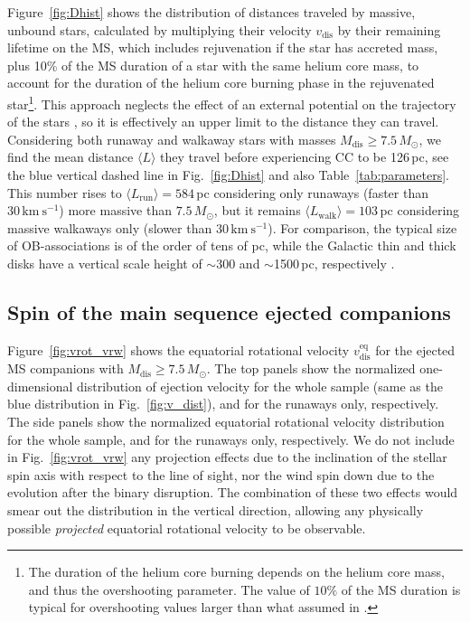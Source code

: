\documentclass{aa}
\DeclareRobustCommand{\Figref}[1]{Fig.~\ref{#1}}
\DeclareRobustCommand{\Tabref}[1]{Table~\ref{#1}}
\begin{document}
Figure~\ref{fig:Dhist} shows the distribution of distances traveled by
massive, unbound stars, calculated by multiplying their velocity
$v_\mathrm{dis}$ by their remaining lifetime on the MS, which includes
rejuvenation if the star has accreted mass, plus 10\% of the
MS duration of a star with the same helium core mass, to account for
the duration of the helium core burning phase in the rejuvenated
star\footnote{The duration of the helium core burning depends on the helium core mass, and thus the overshooting
parameter. The value of $10\%$ of the MS duration is typical for overshooting values
larger than what assumed in \cite{pols:98}.}.
This approach neglects the effect of an external potential on the trajectory of the
stars \citep[see][for how this could be done]{boubert:17a,boubert:18}, so it is effectively an upper limit to the distance they can travel. Considering both runaway and walkaway stars with masses
$M_\mathrm{dis} \geq7.5\,M_\odot$, we find
the mean distance $\langle L \rangle$ they travel before experiencing
CC to be 126\,pc, see the blue vertical dashed line in
\Figref{fig:Dhist} and also \Tabref{tab:parameters}. This number
rises to $\langle L_\mathrm{run}\rangle=584$\,pc considering only 
runaways (faster than $30\,\mathrm{km \ s^{-1}}$) more massive than
$7.5\,M_\odot$, but it remains $\langle
L_\mathrm{walk}\rangle=103$\,pc considering massive walkaways only
(slower than $30\,\mathrm{km \ s^{-1}}$). For comparison, the typical
size of OB-associations is of the order of tens of pc,
while the Galactic thin and thick disks have a vertical scale height
of $\sim$300 and $\sim$1500\,pc, respectively
\citep[e.g.,][]{gilmore:83}.

\subsection{Spin of the main sequence ejected companions}

Figure~\ref{fig:vrot_vrw} shows the equatorial rotational velocity
$v_\mathrm{dis}^\mathrm{eq}$ for
the ejected MS companions with $M_\mathrm{dis}\geq7.5\,M_\odot$. The top panels show the normalized one-dimensional
distribution of ejection velocity for the whole sample (same as the
blue distribution in \Figref{fig:v_dist}), and for the runaways only,
respectively. The side panels show the normalized equatorial
rotational velocity distribution
for the whole sample, and for the runaways only, respectively.
We do not include
in \Figref{fig:vrot_vrw} any projection effects due to the inclination
of the stellar spin axis with respect to the line of sight, nor the
wind spin down due to the evolution after the binary disruption. The
combination of these two effects would smear out the distribution in
the vertical direction, allowing any physically possible
\emph{projected} equatorial rotational velocity to be observable.
\end{document}
